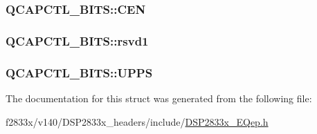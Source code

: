 \subsubsection[{C\+E\+N}]{ Q\+C\+A\+P\+C\+T\+L\+\_\+\+B\+I\+T\+S\+::\+C\+E\+N}\label{struct_q_c_a_p_c_t_l___b_i_t_s_a6bb69fea54c791802690eb23c1fe1e8c}
\hypertarget{struct_q_c_a_p_c_t_l___b_i_t_s_a2123297ac09dbbc73071d4752108e876}{}
\subsubsection[{rsvd1}]{ Q\+C\+A\+P\+C\+T\+L\+\_\+\+B\+I\+T\+S\+::rsvd1}\label{struct_q_c_a_p_c_t_l___b_i_t_s_a2123297ac09dbbc73071d4752108e876}
\hypertarget{struct_q_c_a_p_c_t_l___b_i_t_s_ad78cd88f44cbda76e1774f3742ea8679}{}
\subsubsection[{U\+P\+P\+S}]{ Q\+C\+A\+P\+C\+T\+L\+\_\+\+B\+I\+T\+S\+::\+U\+P\+P\+S}\label{struct_q_c_a_p_c_t_l___b_i_t_s_ad78cd88f44cbda76e1774f3742ea8679}


The documentation for this struct was generated from the following file\+:\begin{DoxyCompactItemize}
\item 
f2833x/v140/\+D\+S\+P2833x\+\_\+headers/include/\hyperlink{_d_s_p2833x___e_qep_8h}{D\+S\+P2833x\+\_\+\+E\+Qep.\+h}\end{DoxyCompactItemize}
